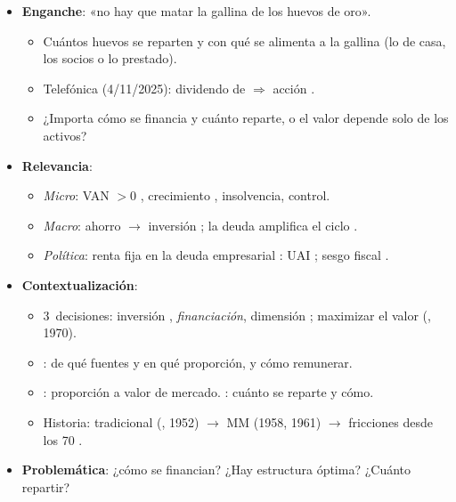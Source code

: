 \documentclass{article}
\begin{document}
\cabecerarepaso
\begin{columnas}

\begin{itemize}
\item \textbf{Enganche}: «no hay que matar la gallina de los huevos de oro».
  \begin{itemize}
  \item Cuántos huevos se reparten y con qué se alimenta a la gallina (lo de casa, los socios o lo prestado).
  \item Telefónica (4/11/2025): dividendo de  $\Rightarrow$ acción .
  \item ¿Importa cómo se financia y cuánto reparte, o el valor depende solo de los activos?
  \end{itemize}
\item \textbf{Relevancia}:
  \begin{itemize}
  \item \emph{Micro}: VAN $>0$ , crecimiento , insolvencia, control.
  \item \emph{Macro}: ahorro $\to$ inversión ; la deuda amplifica el ciclo .
  \item \emph{Política}: renta fija en la deuda empresarial : UAI ; sesgo fiscal .
  \end{itemize}
\item \textbf{Contextualización}:
  \begin{itemize}
  \item 3~decisiones: inversión , \emph{financiación}, dimensión ; maximizar el valor (, 1970).
  \item {}: de qué fuentes y en qué proporción, y cómo remunerar.
  \item {}: proporción a valor de mercado. : cuánto se reparte y cómo.
  \item Historia: tradicional (, 1952) $\to$ MM (1958, 1961) $\to$ fricciones desde los 70 .
  \end{itemize}
\item \textbf{Problemática}: ¿cómo se financian? ¿Hay estructura óptima? ¿Cuánto repartir?

\end{itemize}
\end{columnas}
\end{document}
